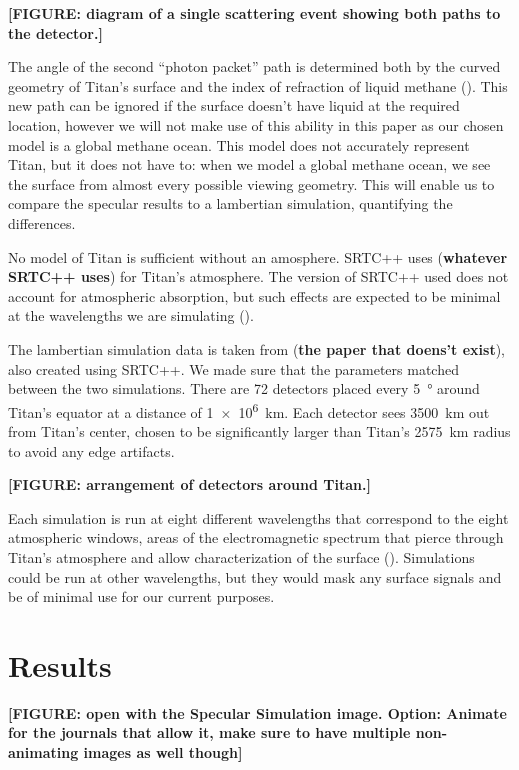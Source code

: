 \documentclass{article}
\begin{document}
\textbf{\color{red} [FIGURE: diagram of a single scattering event showing both paths to the detector.] \color{black}}

The angle of the second ``photon packet'' path is determined both by the curved geometry of Titan's surface and the index of refraction of liquid methane (). This new path can be ignored if the surface doesn't have liquid at the required location, however we will not make use of this ability in this paper as our chosen model is a global methane ocean. This model does not accurately represent Titan, but it does not have to: when we model a global methane ocean, we see the surface from almost every possible viewing geometry. This will enable us to compare the specular results to a lambertian simulation, quantifying the differences. 

No model of Titan is sufficient without an amosphere. SRTC++ uses (\textbf{whatever SRTC++ uses}) for Titan's atmosphere. The version of SRTC++ used does not account for atmospheric absorption, but such effects are expected to be minimal at the wavelengths we are simulating ().

The lambertian simulation data is taken from (\textbf{the paper that doens't exist}), also created using SRTC++. We made sure that the  parameters matched between the two simulations. There are 72 detectors placed every \qty{5}{\degree} around Titan's equator at a distance of \qty{1e6}{\kilo\meter}. Each detector sees \qty{3500}{\kilo\meter} out from Titan's center, chosen to be significantly larger than Titan's \qty{2575}{\kilo\meter} radius to avoid any edge artifacts. 

\textbf{\color{red} [FIGURE: arrangement of detectors around Titan.] \color{black}}

Each simulation is run at eight different wavelengths that correspond to the eight atmospheric windows, areas of the electromagnetic spectrum that pierce through Titan's atmosphere and allow characterization of the surface (). Simulations could be run at other wavelengths, but they would mask any surface signals and be of minimal use for our current purposes. 

\section{Results}
\textbf{\color{red} [FIGURE: open with the Specular Simulation image. Option: Animate for the journals that allow it, make sure to have multiple non-animating images as well though] \color{black}}
\end{document}
